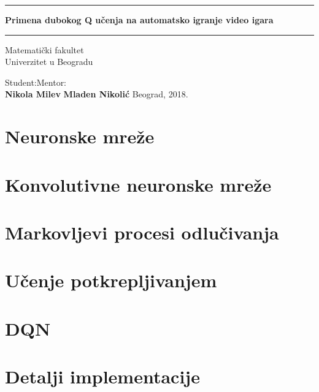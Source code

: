 \documentclass[12pt]{report}
\begin{document}
\begin{titlepage}
    \begin{center}
        \vspace*{1cm}
        \hrule
        \vspace*{1cm}
        \textbf{Primena dubokog Q učenja na automatsko igranje video igara}
        \vspace*{1cm}
        \hrule
        \vspace{1cm}
        \begin{center}
        	Matematički fakultet \\
        	Univerzitet u Beogradu
        \end{center}
        \vspace{1.5cm}
        Student:\hfill Mentor:\\
        \textbf{Nikola Milev}
		\hfill        
        \textbf{Mladen Nikolić}
        \vfill
		Beograd, 2018.
    \end{center}
\end{titlepage}


\tableofcontents{}
\newpage




\chapter{Neuronske mreže}
\chapter{Konvolutivne neuronske mreže}
\chapter{Markovljevi procesi odlučivanja}
\chapter{Učenje potkrepljivanjem}
\chapter{DQN}
\chapter{Detalji implementacije}
\end{document}
